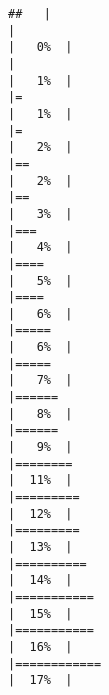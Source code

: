 \documentclass[
]{article}
\begin{document}
\begin{verbatim}
##   |                                                                              |                                                                      |   0%  |                                                                              |                                                                      |   1%  |                                                                              |=                                                                     |   1%  |                                                                              |=                                                                     |   2%  |                                                                              |==                                                                    |   2%  |                                                                              |==                                                                    |   3%  |                                                                              |===                                                                   |   4%  |                                                                              |====                                                                  |   5%  |                                                                              |====                                                                  |   6%  |                                                                              |=====                                                                 |   6%  |                                                                              |=====                                                                 |   7%  |                                                                              |======                                                                |   8%  |                                                                              |======                                                                |   9%  |                                                                              |========                                                              |  11%  |                                                                              |=========                                                             |  12%  |                                                                              |=========                                                             |  13%  |                                                                              |==========                                                            |  14%  |                                                                              |===========                                                           |  15%  |                                                                              |===========                                                           |  16%  |                                                                              |============                                                          |  17%  |                                                                              
\end{verbatim}
\end{document}
